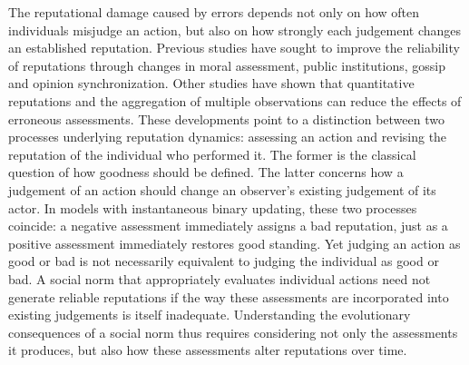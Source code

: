 The reputational damage caused by errors depends not only on how often individuals misjudge an action, but also on how strongly each judgement changes an established reputation. Previous studies have sought to improve the reliability of reputations through changes in moral assessment\cite{radzvilavicius2019,schmid2021,okada2024}, public institutions\cite{radzvilavicius2021}, gossip\cite{kawakatsu2024} and opinion synchronization\cite{murase2024synchronization,tham2026}. Other studies have shown that quantitative reputations and the aggregation of multiple observations can reduce the effects of erroneous assessments\cite{clark2020,schmid2023,michelmata2024}. These developments point to a distinction between two processes underlying reputation dynamics: assessing an action and revising the reputation of the individual who performed it. The former is the classical question of how goodness should be defined\cite{ohtsuki2004}. The latter concerns how a judgement of an action should change an observer's existing judgement of its actor. In models with instantaneous binary updating, these two processes coincide: a negative assessment immediately assigns a bad reputation, just as a positive assessment immediately restores good standing\cite{ohtsuki2004,ohtsuki2006,hilbe2018}. Yet judging an action as good or bad is not necessarily equivalent to judging the individual as good or bad. A social norm that appropriately evaluates individual actions need not generate reliable reputations if the way these assessments are incorporated into existing judgements is itself inadequate. Understanding the evolutionary consequences of a social norm thus requires considering not only the assessments it produces, but also how these assessments alter reputations over time.

